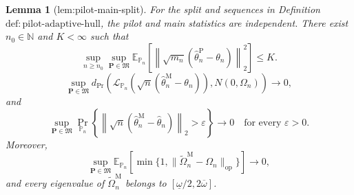 \documentclass{article}
\newtheorem{lemma}{Lemma}
\begin{document}
\begin{lemma}[lem:pilot-main-split]\label{lem:pilot-main-split}
For the split and sequences in Definition \(\mathrm{def:pilot\text{-}adaptive\text{-}hull}\), the pilot and main statistics are independent.  There exist \(n_0\in\mathbb N\) and \(K<\infty\) such that
\[
 \sup_{n\ge n_0}\sup_{\mathbf P\in\mathfrak M}
 \mathbb E_{\mathbb P_n}\!\left[
 \left\|\sqrt{m_n}(\widehat\theta_n^{\mathrm P}-\theta_n)\right\|_2^2
 \right]\le K.
\]
\[
 \sup_{\mathbf P\in\mathfrak M}
 d_{\mathrm{Pr}}\!\left(
 \mathcal L_{\mathbb P_n}(\sqrt n(\widehat\theta_n^{\mathrm M}-\theta_n)),
 N(0,\Omega_n)
 \right)\longrightarrow0,
\]
and
\[
 \sup_{\mathbf P\in\mathfrak M}
 \Pr_{\mathbb P_n}\!\left\{
 \left\|\sqrt n(\widehat\theta_n^{\mathrm M}-\widehat\theta_n)\right\|_2>\varepsilon
 \right\}\longrightarrow0
 \quad\text{for every }\varepsilon>0.
\]
Moreover,
\[
 \sup_{\mathbf P\in\mathfrak M}
 \mathbb E_{\mathbb P_n}\!\left[
 \min\{1,\|\widetilde\Omega_n^{\mathrm M}-\Omega_n\|_{\mathrm{op}}\}
 \right]\longrightarrow0,
\]
and every eigenvalue of \(\widetilde\Omega_n^{\mathrm M}\) belongs to \([\underline\omega/2,2\overline\omega]\).
\end{lemma}
\end{document}

